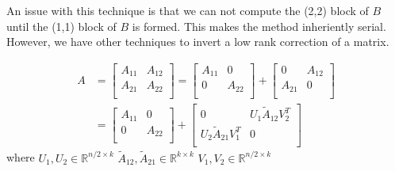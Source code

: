 
An issue with this technique is that we can not compute the (2,2) block of $B$ until the (1,1) block of $B$ is formed. This makes the method inheriently serial. However, we have other techniques to invert a low rank correction of a matrix.

\begin{align*}
    A &=
    \begin{bmatrix}
       A_{11} & A_{12} \\
       A_{21} & A_{22} \\
    \end{bmatrix}
    =
    \begin{bmatrix}
       A_{11} & 0 \\
       0 & A_{22} \\
    \end{bmatrix}
    +
    \begin{bmatrix}
       0 & A_{12} \\
       A_{21} & 0 \\
    \end{bmatrix}
    \\
    &=
    \begin{bmatrix}
       A_{11} & 0 \\
       0 & A_{22} \\
    \end{bmatrix}
    +
    \begin{bmatrix}
       0 & U_1\widetilde{A}_{12}V_2^T \\
       U_2\widetilde{A}_{21}V_1^T& 0 \\
    \end{bmatrix}
\end{align*}
where $U_1, U_2 \in \mathbb{R}^{n/2 \times k}$ \quad $\widetilde{A}_{12}, \widetilde{A}_{21}\in \mathbb{R}^{k \times k}$ \quad $V_1, V_2 \in \mathbb{R}^{n/2 \times k}$
